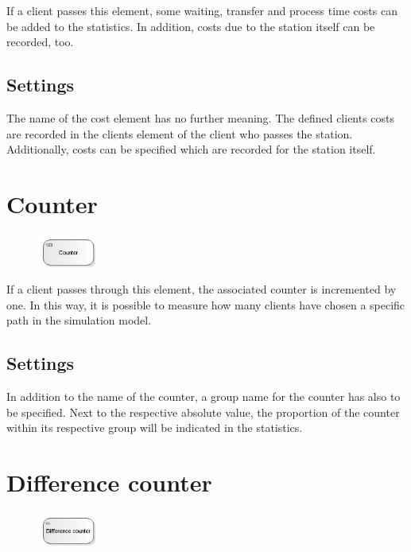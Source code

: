 If a client passes this element, some waiting, transfer and process time costs can be added to the
statistics. In addition, costs due to the station itself can be recorded, too.

\subsection*{Settings}

The name of the cost element has no further meaning. The defined clients costs are recorded in the clients element
of the client who passes the station. Additionally, costs can be specified which are recorded for the station itself.


\section{Counter}
\label{ref:ModelElementCounter}

\begin{figure}
\vspace{-22pt}
\includegraphics[width=2cm]{imageModelElementCounter.png}
\vspace{-22pt}
\end{figure}

If a client passes through this element, the associated counter is incremented by one.
In this way, it is possible to measure how many clients have chosen a specific path in the simulation model.

\subsection*{Settings}

In addition to the name of the counter, a group name for the counter has also to be specified.
Next to the respective absolute value, the proportion of the counter within its respective group
will be indicated in the statistics.


\section{Difference counter}
\label{ref:ModelElementDifferentialCounter}

\begin{figure}
\vspace{-22pt}
\includegraphics[width=2cm]{imageModelElementDifferentialCounter.png}
\vspace{-22pt}
\end{figure}

